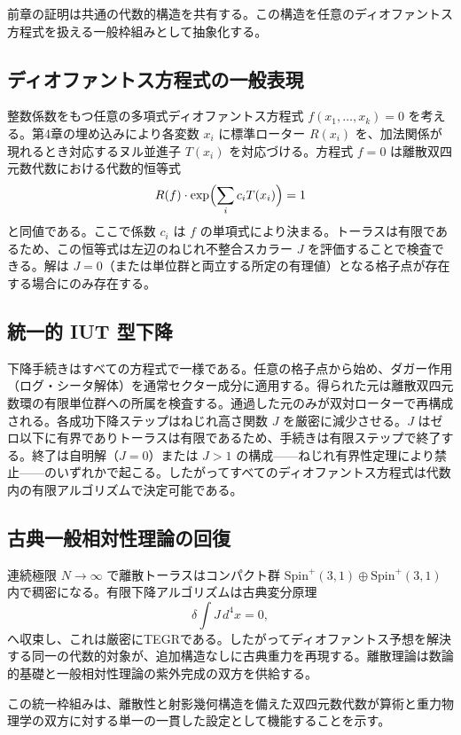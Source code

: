 \documentclass[a4paper]{article}
\theoremstyle{definition}
\begin{document}
前章の証明は共通の代数的構造を共有する。この構造を任意のディオファントス方程式を扱える一般枠組みとして抽象化する。

\subsection{ディオファントス方程式の一般表現}

整数係数をもつ任意の多項式ディオファントス方程式 $f(x_1,\dots,x_k) = 0$ を考える。第4章の埋め込みにより各変数 $x_i$ に標準ローター $R(x_i)$ を、加法関係が現れるとき対応するヌル並進子 $T(x_i)$ を対応づける。方程式 $f = 0$ は離散双四元数代数における代数的恒等式
\[
R(f) \cdot \exp\Bigl( \sum_i c_i T(x_i) \Bigr) = 1
\]
と同値である。ここで係数 $c_i$ は $f$ の単項式により決まる。トーラスは有限であるため、この恒等式は左辺のねじれ不整合スカラー $J$ を評価することで検査できる。解は $J = 0$（または単位群と両立する所定の有理値）となる格子点が存在する場合にのみ存在する。

\subsection{統一的 IUT 型下降}

下降手続きはすべての方程式で一様である。任意の格子点から始め、ダガー作用（ログ・シータ解体）を通常セクター成分に適用する。得られた元は離散双四元数環の有限単位群への所属を検査する。通過した元のみが双対ローターで再構成される。各成功下降ステップはねじれ高さ関数 $J$ を厳密に減少させる。$J$ はゼロ以下に有界でありトーラスは有限であるため、手続きは有限ステップで終了する。終了は自明解（$J = 0$）または $J > 1$ の構成——ねじれ有界性定理により禁止——のいずれかで起こる。したがってすべてのディオファントス方程式は代数内の有限アルゴリズムで決定可能である。

\subsection{古典一般相対性理論の回復}

連続極限 $N \to \infty$ で離散トーラスはコンパクト群 $\mathrm{Spin}^+(3,1) \oplus \mathrm{Spin}^+(3,1)$ 内で稠密になる。有限下降アルゴリズムは古典変分原理
\[
\delta \int J \, d^4x = 0,
\]
へ収束し、これは厳密にTEGRである。したがってディオファントス予想を解決する同一の代数的対象が、追加構造なしに古典重力を再現する。離散理論は数論的基礎と一般相対性理論の紫外完成の双方を供給する。

この統一枠組みは、離散性と射影幾何構造を備えた双四元数代数が算術と重力物理学の双方に対する単一の一貫した設定として機能することを示す。
\end{document}
